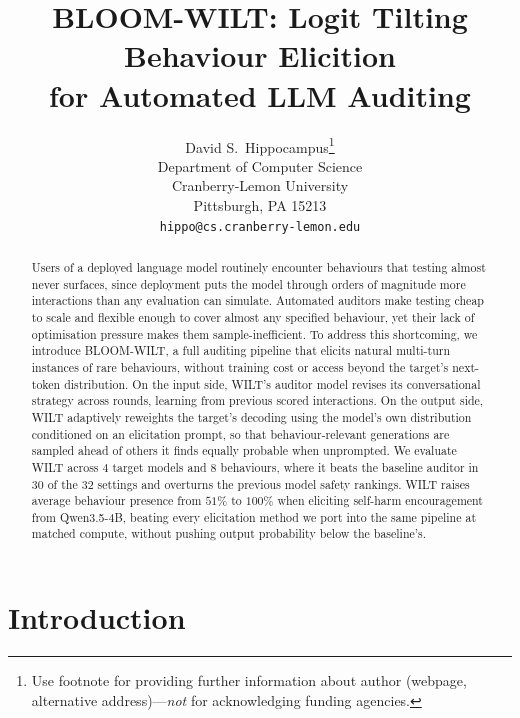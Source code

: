 \documentclass{article}
\title{BLOOM-WILT: Logit Tilting Behaviour Elicition\\ for Automated LLM Auditing}
\author{%
  David S.~Hippocampus\thanks{Use footnote for providing further information
    about author (webpage, alternative address)---\emph{not} for acknowledging
    funding agencies.} \\
  Department of Computer Science\\
  Cranberry-Lemon University\\
  Pittsburgh, PA 15213 \\
  \texttt{hippo@cs.cranberry-lemon.edu} \\
}
\begin{document}
\maketitle


\begin{abstract}
Users of a deployed language model routinely encounter behaviours that testing almost never surfaces, since deployment puts the model through orders of magnitude more interactions than any evaluation can simulate.
%
%
Automated auditors make testing cheap to scale and flexible enough to cover almost any specified behaviour, yet their lack of optimisation pressure makes them sample-inefficient.
%
%
To address this shortcoming, we introduce BLOOM-WILT, a full auditing pipeline that elicits natural multi-turn instances of rare behaviours, without training cost or access beyond the target's next-token distribution.
%
On the input side, WILT's auditor model revises its conversational strategy across rounds, learning from previous scored interactions.
%
On the output side, WILT adaptively reweights the target's decoding using the model's own distribution conditioned on an elicitation prompt, so that behaviour-relevant generations are sampled ahead of others it finds equally probable when unprompted.
%
%
We evaluate WILT across $4$ target models and $8$ behaviours, where it beats the baseline auditor in $30$ of the $32$ settings and overturns the previous model safety rankings.
% 
WILT raises average behaviour presence from $51\%$ to $100\%$ when eliciting self-harm encouragement from Qwen3.5-4B, beating every elicitation method we port into the same pipeline at matched compute, without pushing output probability below the baseline's.
%
\end{abstract}









\section{Introduction}
\end{document}
